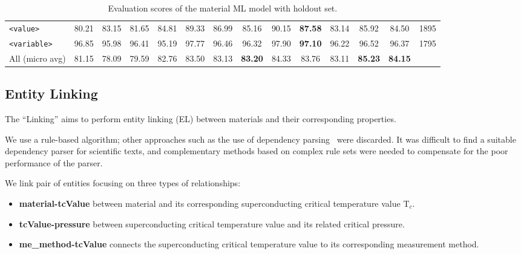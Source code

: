 \documentclass[]{interact}
\theoremstyle{plain}%
\theoremstyle{definition}
\theoremstyle{remark}
\newcommand{\tc}{T$_{c}$}
\begin{document}
\begin{table}[ht]
{\begin{tabular}{l ccc ccc ccc ccc r}
\texttt{<value>}       & 80.21 & 83.15 & 81.65 & 84.81 & 89.33 & 86.99 & 85.16 & 90.15 & \textbf{87.58} & 83.14 & 85.92 & 84.50 & 1895 \\
\texttt{<variable>}    & 96.85 & 95.98 & 96.41 & 95.19 & 97.77 & 96.46 & 96.32 & 97.90 & \textbf{97.10} & 96.22 & 96.52 & 96.37 & 1795 \\
\midrule
All (micro avg)       & 81.15 & 78.09 & 79.59 & 82.76 & 83.50 & 83.13 & \textbf{83.20} & 84.33 & 83.76 & 83.11 & \textbf{85.23} & \textbf{84.15} &   \\
\bottomrule
\end{tabular}
}
\caption{\label{tab:evaluation-10fold-material-parser} Evaluation scores of the material ML model with holdout set. }
\end{table}

\subsection{Entity Linking}
\label{subsubsec:linking}

The ``Linking'' aims to perform entity linking (EL) between materials and their corresponding properties.

We use a rule-based algorithm; other approaches such as the use of dependency parsing~\cite{yoshikawa:2017acl, Tiktinsky2020pyBARTES, swayamdipta:17, zhou-zhao-2019-head} were discarded. 
It was difficult to find a suitable dependency parser for scientific texts, and complementary methods based on complex rule sets were needed to compensate for the poor performance of the parser.

We link pair of entities focusing on three types of relationships: 
\begin{itemize}
    \item \textbf{material-tcValue} between material and its corresponding superconducting critical temperature value \tc. 
    \item \textbf{tcValue-pressure} between superconducting critical temperature value and its related critical pressure.
    \item \textbf{me\_method-tcValue} connects the superconducting critical temperature value to its corresponding measurement method.
\end{itemize}
\end{document}
